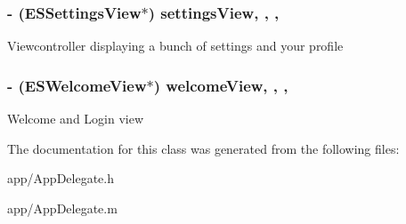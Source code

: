 \subsubsection[{settings\+View}]{\setlength{\rightskip}{0pt plus 5cm}-\/ ({\bf E\+S\+Settings\+View}$\ast$) settings\+View\hspace{0.3cm}{\ttfamily [read]}, {\ttfamily [write]}, {\ttfamily [nonatomic]}, {\ttfamily [strong]}}\label{interface_app_delegate_ab9acacc615638a327d7cecfaa665e2c2}
Viewcontroller displaying a bunch of settings and your profile \hypertarget{interface_app_delegate_a9bff5a3a8207cbf80c8d9a325a6314f3}{}
\subsubsection[{welcome\+View}]{\setlength{\rightskip}{0pt plus 5cm}-\/ ({\bf E\+S\+Welcome\+View}$\ast$) welcome\+View\hspace{0.3cm}{\ttfamily [read]}, {\ttfamily [write]}, {\ttfamily [nonatomic]}, {\ttfamily [strong]}}\label{interface_app_delegate_a9bff5a3a8207cbf80c8d9a325a6314f3}
Welcome and Login view 

The documentation for this class was generated from the following files\+:\begin{DoxyCompactItemize}
\item 
app/App\+Delegate.\+h\item 
app/App\+Delegate.\+m\end{DoxyCompactItemize}
